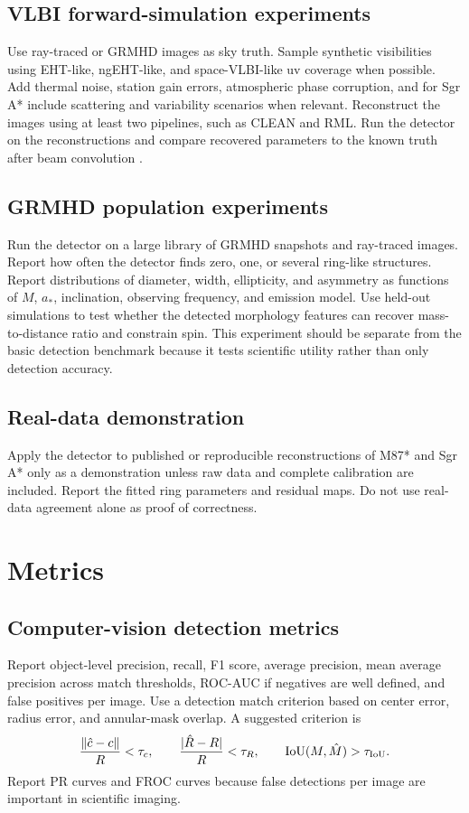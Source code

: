\documentclass[11pt]{article}
\begin{document}
\subsection{VLBI forward-simulation experiments}
Use ray-traced or GRMHD images as sky truth. Sample synthetic visibilities using EHT-like, ngEHT-like, and space-VLBI-like uv coverage when possible. Add thermal noise, station gain errors, atmospheric phase corruption, and for Sgr A* include scattering and variability scenarios when relevant. Reconstruct the images using at least two pipelines, such as CLEAN and RML. Run the detector on the reconstructions and compare recovered parameters to the known truth after beam convolution \citep{Roelofs2019,Johnson2023,Kudriashov2021,Trippe2023}.

\subsection{GRMHD population experiments}
Run the detector on a large library of GRMHD snapshots and ray-traced images. Report how often the detector finds zero, one, or several ring-like structures. Report distributions of diameter, width, ellipticity, and asymmetry as functions of $M$, $a_*$, inclination, observing frequency, and emission model. Use held-out simulations to test whether the detected morphology features can recover mass-to-distance ratio and constrain spin. This experiment should be separate from the basic detection benchmark because it tests scientific utility rather than only detection accuracy.

\subsection{Real-data demonstration}
Apply the detector to published or reproducible reconstructions of M87* and Sgr A* only as a demonstration unless raw data and complete calibration are included. Report the fitted ring parameters and residual maps. Do not use real-data agreement alone as proof of correctness.

\section{Metrics}

\subsection{Computer-vision detection metrics}
Report object-level precision, recall, F1 score, average precision, mean average precision across match thresholds, ROC-AUC if negatives are well defined, and false positives per image. Use a detection match criterion based on center error, radius error, and annular-mask overlap. A suggested criterion is
\begin{equation}
    \frac{\lVert \hat{c}-c\rVert}{R} < \tau_c, \qquad \frac{|\hat{R}-R|}{R}<\tau_R, \qquad {\rm IoU}(M,\hat{M})>\tau_{\rm IoU}.
\end{equation}
Report PR curves and FROC curves because false detections per image are important in scientific imaging.
\end{document}
